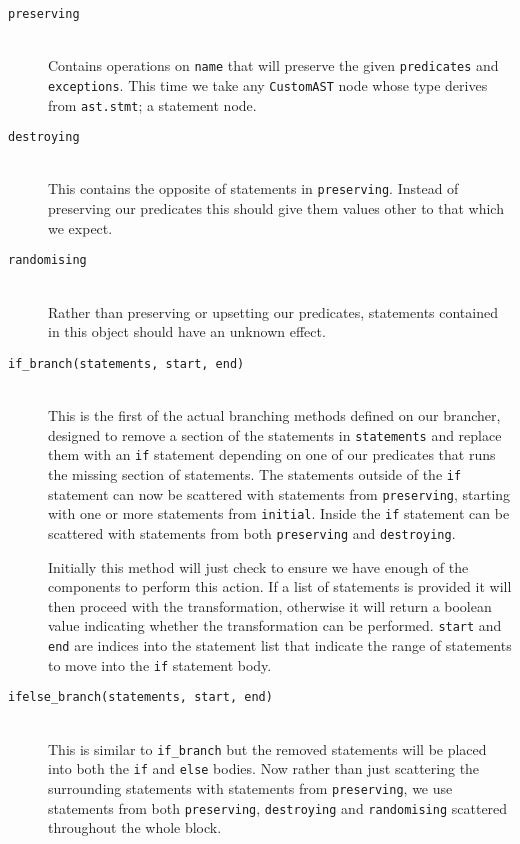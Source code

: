 \documentclass[twoside,a4paper]{report}
\begin{document}
\begin{description}
\item[\texttt{preserving}] \hfill \\
Contains operations on \texttt{name} that will preserve the given \texttt{predicates} and \texttt{exceptions}. This time we take any \texttt{CustomAST}
node whose type derives from \texttt{ast.stmt}; a statement node.

\item[\texttt{destroying}] \hfill \\
This contains the opposite of statements in \texttt{preserving}. Instead of preserving our predicates this should give them values other to that which we
expect.

\item[\texttt{randomising}] \hfill \\
Rather than preserving or upsetting our predicates, statements contained in this object should have an unknown effect.

\item[\texttt{if\_branch(statements, start, end)}] \hfill \\
This is the first of the actual branching methods defined on our brancher, designed to remove a section of the statements in \texttt{statements} and replace
them with an \texttt{if} statement depending on one of our predicates that runs the missing section of statements. The statements outside of the \texttt{if}
statement can now be scattered with statements from \texttt{preserving}, starting with one or more statements from \texttt{initial}. Inside the \texttt{if}
statement can be scattered with statements from both \texttt{preserving} and \texttt{destroying}.

Initially this method will just check to ensure we have enough of the components to perform this action. If a list of statements is provided it will then
proceed with the transformation, otherwise it will return a boolean value indicating whether the transformation can be performed. \texttt{start} and \texttt{end}
are indices into the statement list that indicate the range of statements to move into the \texttt{if} statement body.

\item[\texttt{ifelse\_branch(statements, start, end)}] \hfill \\
This is similar to \texttt{if\_branch} but the removed statements will be placed into both the \texttt{if} and \texttt{else} bodies. Now rather than just scattering
the surrounding statements with statements from \texttt{preserving}, we use statements from both \texttt{preserving}, \texttt{destroying} and \texttt{randomising}
scattered throughout the whole block.


\end{description}
\end{document}
